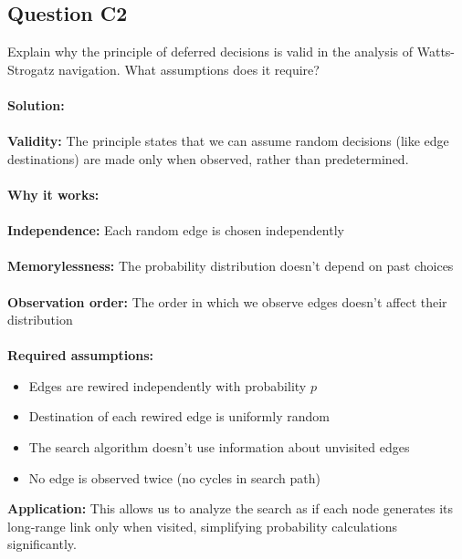 \documentclass[11pt,a4paper]{article}
\theoremstyle{definition}
\begin{document}
\subsection{Question C2}
Explain why the principle of deferred decisions is valid in the analysis of Watts-Strogatz navigation. What assumptions does it require?\\
\\
\textbf{Solution:}\\
\\
\textbf{Validity:} The principle states that we can assume random decisions (like edge destinations) are made only when observed, rather than predetermined.\\
\\
\textbf{Why it works:}\\
\\
\textbf{Independence:} Each random edge is chosen independently\\
\\
\textbf{Memorylessness:} The probability distribution doesn't depend on past choices\\
\\
\textbf{Observation order:} The order in which we observe edges doesn't affect their distribution\\
\\
\textbf{Required assumptions:}\\
\begin{itemize}
    \item Edges are rewired independently with probability $p$
    \item Destination of each rewired edge is uniformly random
    \item The search algorithm doesn't use information about unvisited edges
    \item No edge is observed twice (no cycles in search path)
\end{itemize}

\textbf{Application:} This allows us to analyze the search as if each node generates its long-range link only when visited, simplifying probability calculations significantly.
\end{document}
